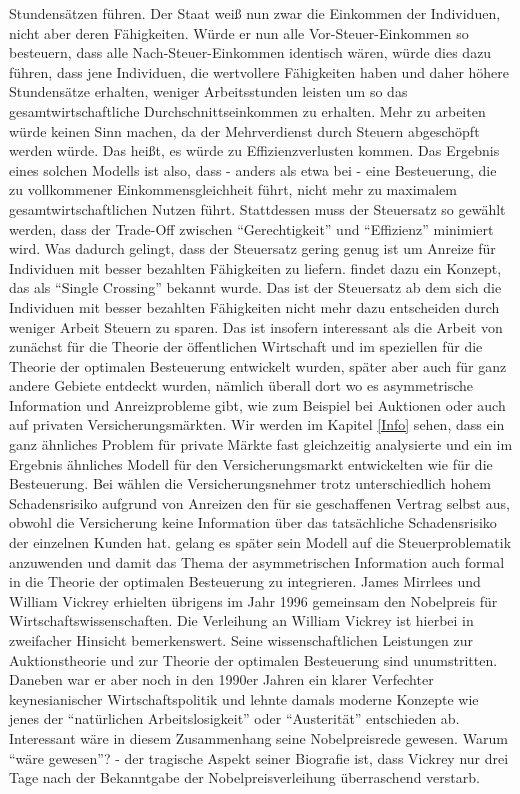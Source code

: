 Stundensätzen führen. Der Staat weiß nun zwar die Einkommen der Individuen, nicht aber deren Fähigkeiten. Würde er nun alle Vor-Steuer-Einkommen so besteuern, dass alle Nach-Steuer-Einkommen identisch wären, würde dies dazu führen, dass jene Individuen, die wertvollere Fähigkeiten haben und daher höhere Stundensätze erhalten, weniger Arbeitsstunden leisten um so das gesamtwirtschaftliche Durchschnittseinkommen zu erhalten. Mehr zu arbeiten würde keinen Sinn machen, da der Mehrverdienst durch Steuern abgeschöpft werden würde. Das heißt, es würde zu Effizienzverlusten kommen. Das Ergebnis eines solchen Modells ist also, dass - anders als etwa bei \Textcite{Pigou1920} - eine Besteuerung, die zu vollkommener Einkommensgleichheit führt, nicht mehr zu maximalem gesamtwirtschaftlichen Nutzen führt. Stattdessen muss der Steuersatz so gewählt werden, dass der Trade-Off zwischen "`Gerechtigkeit"' und "`Effizienz"' minimiert wird. Was dadurch gelingt, dass der Steuersatz gering genug ist um Anreize für Individuen mit besser bezahlten Fähigkeiten zu liefern. \textcite{Mirrlees1971} findet dazu ein Konzept, das als "`Single Crossing"' bekannt wurde. Das ist der Steuersatz ab dem sich die Individuen mit besser bezahlten Fähigkeiten nicht mehr dazu entscheiden durch weniger Arbeit Steuern zu sparen. Das ist insofern interessant als die Arbeit von \textcite{Mirrlees1971} zunächst für die Theorie der öffentlichen Wirtschaft und im speziellen für die Theorie der optimalen Besteuerung entwickelt wurden, später aber auch für ganz andere Gebiete entdeckt wurden, nämlich überall dort wo es asymmetrische Information und Anreizprobleme gibt, wie zum Beispiel bei Auktionen oder auch auf privaten Versicherungsmärkten. Wir werden im Kapitel \ref{Info} sehen, dass \textcite{Akerlof1970} ein ganz ähnliches Problem für private Märkte fast gleichzeitig analysierte und \textcite{Stiglitz1976a} ein im Ergebnis ähnliches Modell für den Versicherungsmarkt entwickelten wie \textcite{Mirrlees1971} für die Besteuerung. Bei \textcite{Stiglitz1976a} wählen die Versicherungsnehmer trotz unterschiedlich hohem Schadensrisiko aufgrund von Anreizen den für sie geschaffenen Vertrag selbst aus, obwohl die Versicherung keine Information über das tatsächliche Schadensrisiko der einzelnen Kunden hat. \textcite{Stiglitz1982} gelang es später sein Modell auf die Steuerproblematik anzuwenden und damit das Thema der asymmetrischen Information auch formal in die Theorie der optimalen Besteuerung zu integrieren. James Mirrlees und William Vickrey erhielten übrigens im Jahr 1996 gemeinsam den Nobelpreis für Wirtschaftswissenschaften. Die Verleihung an William Vickrey ist hierbei in zweifacher Hinsicht bemerkenswert. Seine wissenschaftlichen Leistungen zur Auktionstheorie und zur Theorie der optimalen Besteuerung sind unumstritten. Daneben war er aber noch in den 1990er Jahren ein klarer Verfechter keynesianischer Wirtschaftspolitik und lehnte damals moderne Konzepte wie jenes der "`natürlichen Arbeitslosigkeit"' oder "`Austerität"' entschieden ab. Interessant wäre in diesem Zusammenhang seine Nobelpreisrede gewesen. Warum "`wäre gewesen"'? - der tragische Aspekt seiner Biografie ist, dass Vickrey nur drei Tage nach der Bekanntgabe der Nobelpreisverleihung überraschend verstarb.

